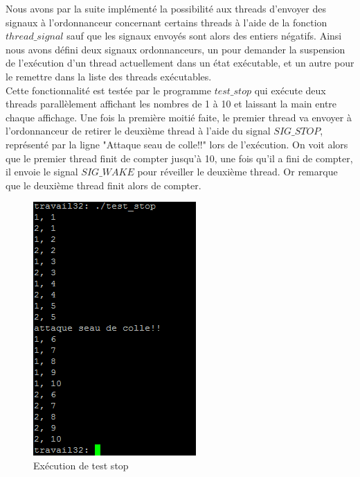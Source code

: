 	Nous avons par la suite implémenté la possibilité aux threads
        d'envoyer des signaux à l'ordonnanceur concernant certains
        threads à l'aide de la fonction $thread\_signal$ sauf que les
        signaux envoyés sont alors des entiers négatifs. Ainsi nous
        avons défini deux signaux ordonnanceurs, un pour demander la
        suspension de l'exécution d'un thread actuellement dans un
        état exécutable, et un autre pour le remettre dans la liste
        des threads exécutables.\\
	
	Cette fonctionnalité est testée par le programme $test\_stop$
        qui exécute deux threads parallèlement affichant les nombres
        de 1 à 10 et laissant la main entre chaque affichage. Une fois
        la première moitié faite, le premier thread va envoyer à
        l'ordonnanceur de retirer le deuxième thread à l'aide du
        signal $SIG\_STOP$, représenté par la ligne "Attaque seau de
        colle!!" lors de l'exécution. On voit alors que le premier
        thread finit de compter jusqu'à 10, une fois qu'il a fini de
        compter, il envoie le signal $SIG\_WAKE$ pour réveiller le
        deuxième thread. Or remarque que le deuxième thread finit
        alors de compter.\\

\begin{figure}[h]
  \begin{minipage}[c]{.45\linewidth}
    \begin{center}
      \includegraphics[]{test_stop.png}
      \caption{Ex\'ecution de test stop}
      \label{test stop}
    \end{center}
  \end{minipage}
\end{figure}
